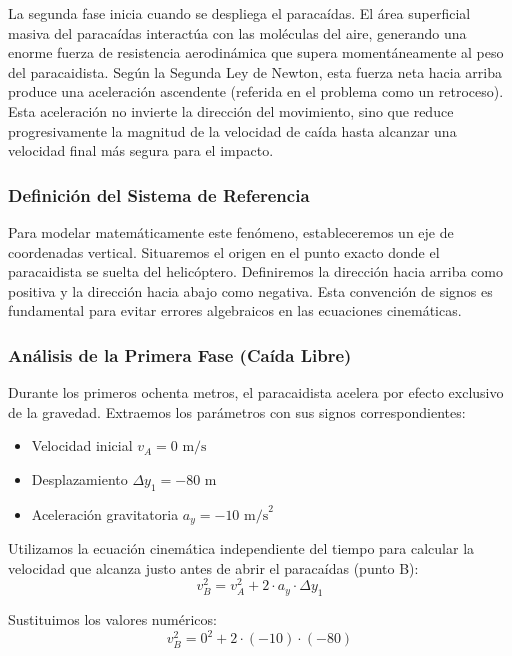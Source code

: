 \documentclass[12pt, a4paper]{article}
\begin{document}
La segunda fase inicia cuando se despliega el paracaídas. El área superficial masiva del paracaídas interactúa con las moléculas del aire, generando una enorme fuerza de resistencia aerodinámica que supera momentáneamente al peso del paracaidista. Según la Segunda Ley de Newton, esta fuerza neta hacia arriba produce una aceleración ascendente (referida en el problema como un retroceso). Esta aceleración no invierte la dirección del movimiento, sino que reduce progresivamente la magnitud de la velocidad de caída hasta alcanzar una velocidad final más segura para el impacto.

\subsubsection*{Definición del Sistema de Referencia}

Para modelar matemáticamente este fenómeno, estableceremos un eje de coordenadas vertical. Situaremos el origen en el punto exacto donde el paracaidista se suelta del helicóptero. Definiremos la dirección hacia arriba como positiva y la dirección hacia abajo como negativa. Esta convención de signos es fundamental para evitar errores algebraicos en las ecuaciones cinemáticas.

\subsubsection*{Análisis de la Primera Fase (Caída Libre)}

Durante los primeros ochenta metros, el paracaidista acelera por efecto exclusivo de la gravedad. Extraemos los parámetros con sus signos correspondientes:
\begin{itemize}
    \item Velocidad inicial $v_A = 0 \text{ m/s}$
    \item Desplazamiento $\Delta y_1 = -80 \text{ m}$
    \item Aceleración gravitatoria $a_y = -10 \text{ m/s}^2$
\end{itemize}

Utilizamos la ecuación cinemática independiente del tiempo para calcular la velocidad que alcanza justo antes de abrir el paracaídas (punto B):
\begin{equation}
v_B^2 = v_A^2 + 2 \cdot a_y \cdot \Delta y_1
\end{equation}

Sustituimos los valores numéricos:
\begin{equation}
v_B^2 = 0^2 + 2 \cdot (-10) \cdot (-80)
\end{equation}
\end{document}
